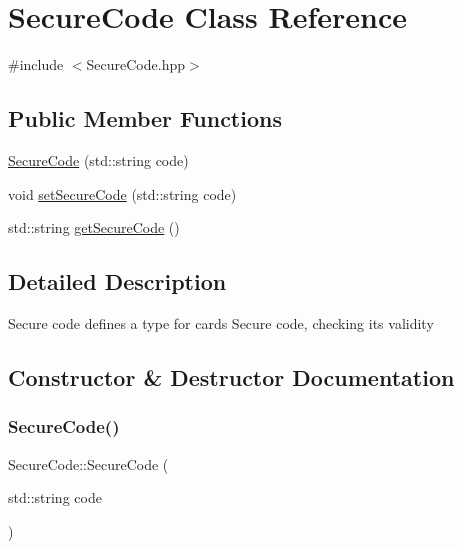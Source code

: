 \hypertarget{class_secure_code}{}\section{Secure\+Code Class Reference}
\label{class_secure_code}


{\ttfamily \#include $<$Secure\+Code.\+hpp$>$}

\subsection*{Public Member Functions}
\begin{DoxyCompactItemize}
\item 
\mbox{\hyperlink{class_secure_code_a438ca6fb3765c40022c9ae20d76040b3}{Secure\+Code}} (std\+::string code)
\item 
void \mbox{\hyperlink{class_secure_code_a7417a7fff51641cd8e5f829af6af7eea}{set\+Secure\+Code}} (std\+::string code)
\item 
std\+::string \mbox{\hyperlink{class_secure_code_a5ead36d45429c9c84d3b9d03b7aef63b}{get\+Secure\+Code}} ()
\end{DoxyCompactItemize}


\subsection{Detailed Description}
Secure code defines a type for card\textquotesingle{}s Secure code, checking its validity 

\subsection{Constructor \& Destructor Documentation}
\mbox{\label{class_secure_code_a438ca6fb3765c40022c9ae20d76040b3}} 
\subsubsection{\texorpdfstring{SecureCode()}{SecureCode()}}
{\footnotesize\ttfamily Secure\+Code\+::\+Secure\+Code (\begin{DoxyParamCaption}\item[{std\+::string}]{code }\end{DoxyParamCaption})}



